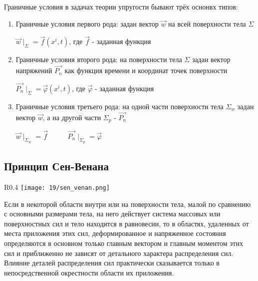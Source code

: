 Граничные условия в задачах теории упругости бывают трёх оснонвх типов:
\begin{enumerate}
  \item Граничные условия первого рода: задан вектор $\vec{w}$ на всей поверхности тела $\Sigma$
        \begin{center}
          $\vec{w}\mid_{\Sigma} = \vec{f}(x^i,t)$, где $\vec{f}$ - заданная функция
        \end{center}

  \item Граничные условия второго рода: на поверхности тела $\Sigma$ задан вектор напряжений $\vec{P_n}$ как функция времени и координат точек поверхности
        \begin{center}
          $\vec{P_n}\mid_{\Sigma} = \vec{\varphi}(x^i,t)$, где $\vec{\varphi}$ - заданная функция
        \end{center}

  \item Граничные условия третьего рода: на одной части поверхности тела  $\Sigma_w$ задан вектор $\vec{w}$, а на другой части  $\Sigma_p$ - $\vec{P_n}$
        \begin{center}
          $\vec{w}\mid_{\Sigma_w} = \vec{f}$ \ \ \ \ \  $\vec{P_n}\mid_{\Sigma_p} = \vec{\varphi}$
        \end{center}
\end{enumerate}

\subsection{Принцип Сен-Венана}

\begin{wrapfigure}{R}{0.4\textwidth}
  \texttt{[image: 19/sen\_venan.png]}
\end{wrapfigure}

Если в некоторой области внутри или на поверхности тела, малой по сравнению с основными размерами тела, на него действует система массовых или поверхностных сил и тело находится в равновесии, то в областях, удаленных от места приложения этих сил, деформированное и напряженное состояния определяются в основном только главным вектором и главным моментом этих сил и приближенно не зависят от детального характера распределения сил. Влияние деталей распределения сил практически сказывается только в непосредственной окрестности области их приложения.
